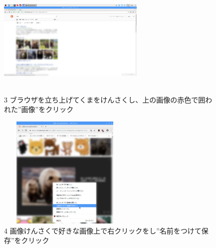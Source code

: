 \documentclass[a4paper,12pt]{jarticle}
\begin{document}
\begin{figure}[t]
  \begin{minipage}{\textwidth}
    \begin{minipage}{7.033cm}
      \includegraphics[width=7.049cm,height=5.554cm]{textbook-img096.png}\\
      3 ブラウザを立ち上げてくまをけんさくし、上の画像の赤色で囲われた”画像”をクリック
    \end{minipage}
    \begin{minipage}{3.582cm}
    \end{minipage}
    \begin{minipage}{6.582cm}
      \includegraphics[width=6.468cm,height=5.406cm]{textbook-img095.png}\\
      4 画像けんさくで好きな画像上で右クリックをし”名前をつけて保存”をクリック
    \end{minipage}
  \end{minipage}


\end{figure}
\end{document}
